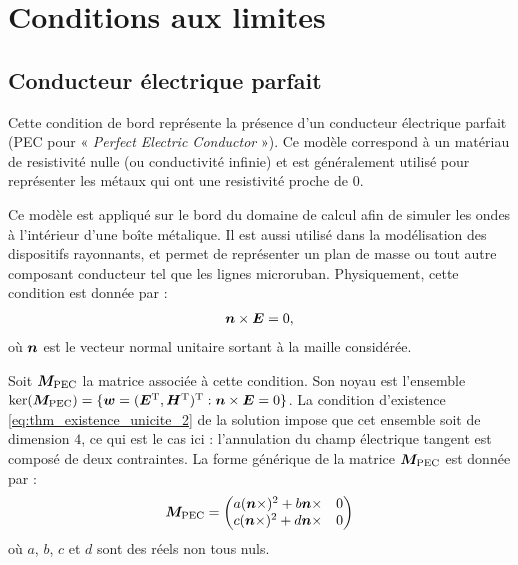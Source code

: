\section{Conditions aux limites}
\label{sect:conditions_aux_limites}


\subsection{Conducteur électrique parfait}
\label{ssect:PEC}


Cette condition de bord représente la présence d’un conducteur
électrique parfait (PEC pour « \textit{Perfect Electric Conductor} »).
Ce modèle correspond à un matériau de resistivité nulle (ou conductivité
infinie) et est généralement utilisé pour représenter les métaux
qui ont une resistivité proche de $0$.

Ce modèle est appliqué sur le bord du domaine de calcul
afin de simuler les ondes à l'intérieur d'une boîte métalique.
Il est aussi utilisé dans la modélisation des dispositifs
rayonnants, et permet de représenter un plan de masse ou tout autre
composant conducteur tel que les lignes microruban.
Physiquement, cette condition est donnée par :
\begin{align}
	\bm{n} \times \bm{E} = 0 ,
\end{align}
où $\bm{n}$ est le vecteur normal unitaire sortant à la maille considérée.

Soit $\bm{M}_{\mathrm{PEC}}$ la matrice associée à cette condition.
Son noyau est l'ensemble $\ker (\bm{M}_{\mathrm{PEC}}) = \lbrace \bm{w} = (\bm{E}^{\mathrm{T}}, \bm{H}^{\mathrm{T}})^{\mathrm{T}} :
\bm{n} \times \bm{E} = 0 \rbrace$.
La condition d’existence \eqref{eq:thm_existence_unicite_2} de la solution
impose que cet ensemble soit de dimension $4$, ce qui est le cas ici :
l’annulation du champ électrique tangent est composé de deux contraintes.
La forme générique de la matrice $\bm{M}_{\mathrm{PEC}}$ est donnée par :
\begin{align}
	\bm{M}_{\mathrm{PEC}} =
	\begin{pmatrix}
		a (\bm{n} \times)^2 + b \bm{n} \times & 0 \\
		c (\bm{n} \times)^2 + d \bm{n} \times & 0
	\end{pmatrix}
\end{align}
où $a$, $b$, $c$ et $d$ sont des réels non tous nuls.


